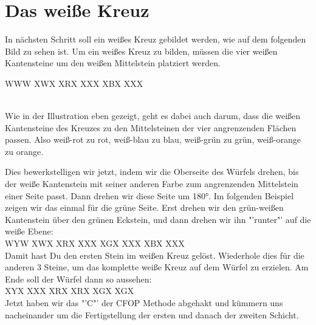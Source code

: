 \section{Das weiße Kreuz}
\parbox{0.7\linewidth}{
In nächsten Schritt soll ein weißes Kreuz gebildet werden, wie auf dem folgenden Bild zu sehen ist.
Um ein weißes Kreuz zu bilden, müssen die vier weißen Kantensteine um den weißen Mittelstein platziert werden.
}\parbox{0.3\linewidth}{
  \RubikCubeGreyAll%
	      {W}{W}{W}
	      {X}{W}{X}%
		 {X}{R}{X}
		 {X}{X}{X}%
		 {X}{B}{X}
		 {X}{X}{X}%
}\\[1em]

Wie in der Illustration eben gezeigt, geht es dabei auch darum, dass die weißen Kantensteine des Kreuzes zu den Mittelsteinen der vier angrenzenden Flächen passen.
Also weiß-rot zu rot, weiß-blau zu blau, weiß-grün zu grün, weiß-orange zu orange.

Dies bewerkstelligen wir jetzt, indem wir die Oberseite des Würfels drehen, bis der weiße Kantenstein mit seiner anderen Farbe zum angrenzenden Mittelstein einer Seite passt.
Dann drehen wir diese Seite um 180°.
Im folgenden Beispiel zeigen wir das einmal für die grüne Seite. Erst drehen wir den grün-weißen Kantenstein über den grünen Eckstein, und dann drehen wir ihn "'runter"' auf die weiße Ebene:\\[1em]

\RubikCubeGreyAll%
            {W}{Y}{W}
            {X}{W}{X}%
               {X}{R}{X}
	       {X}{X}{X}%
	       {X}{G}{X}
	       {X}{X}{X}%
	       {X}{B}{X}
	       {X}{X}{X}%
\quad{}
\quad{}
\quad{}
\\[1em]

Damit hast Du den ersten Stein im weißen Kreuz gelöst.
Wiederhole dies für die anderen 3 Steine, um das komplette weiße Kreuz auf dem Würfel zu erzielen.
Am Ende soll der Würfel dann so aussehen:\\[1em]
\RubikCubeGreyAll%
            {X}{Y}{X}
            {X}{X}{X}%
               {X}{R}{X}
	       {X}{R}{X}%
	       {X}{G}{X}
	       {X}{G}{X}%
\\[1em]

Jetzt haben wir das "'C"' der CFOP Methode abgehakt und kümmern uns nacheinander um die
Fertigstellung der ersten und danach der zweiten Schicht.
